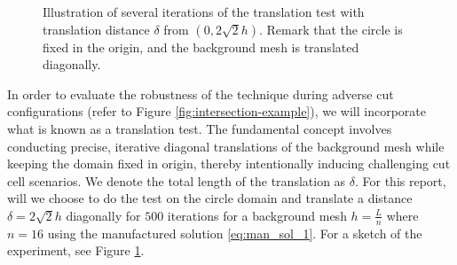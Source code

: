 \documentclass[11pt]{article}
\theoremstyle{remark}
\numberwithin{equation}{section}
\begin{document}
\begin{figure}[h!]
    \centering
    \caption{Illustration of several iterations of the translation test with translation distance $\delta$ from  $(0,2 \sqrt{2}h)  $. Remark that the circle is fixed in the origin, and the background mesh is translated diagonally. }
    \label{fig:illustration_translation}
\end{figure}

In order to evaluate the robustness of the technique during adverse cut configurations (refer to Figure \ref{fig:intersection-example}), we will incorporate what is known as a translation test. The fundamental concept involves conducting precise,
iterative diagonal translations of the background mesh while keeping the domain fixed in origin, thereby intentionally inducing challenging cut cell scenarios. We denote the total length of the translation as $ \delta$. For this report, will we
choose to do the test on the circle domain and translate a distance $\delta = 2\sqrt{2}h  $ diagonally for $500$ iterations for a background mesh $h = \frac{L}{n}$ where $n=16$ using the manufactured solution \eqref{eq:man_sol_1}. For a sketch of the experiment, see Figure \ref{fig:illustration_translation}.
\end{document}
